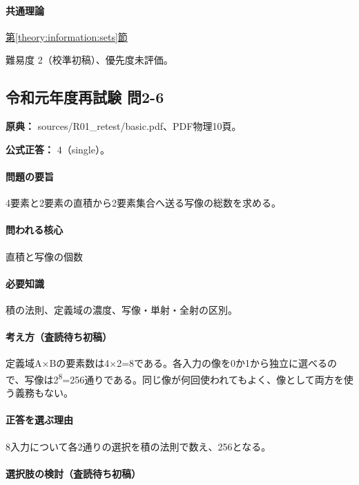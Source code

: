 \paragraph{共通理論} \hyperref[theory:information:sets]{第\ref*{theory:information:sets}節}

\par 難易度 2（校準初稿）、優先度未評価。

\subsection{令和元年度再試験 問2-6}
\label{q:r01-ret-basic-2-6}

\noindent\textbf{原典：} sources/R01\_retest/basic.pdf、PDF物理10頁。

\textbf{公式正答：} 4（single）。

\paragraph{問題の要旨} 4要素と2要素の直積から2要素集合へ送る写像の総数を求める。

\paragraph{問われる核心} 直積と写像の個数

\paragraph{必要知識} 積の法則、定義域の濃度、写像・単射・全射の区別。

\paragraph{考え方（査読待ち初稿）} 定義域A×Bの要素数は4×2=\allowbreak{}8である。各入力の像を0か1から独立に選べるので、写像は2\textsuperscript{8}=256通りである。同じ像が何回使われてもよく、像として両方を使う義務もない。

\paragraph{正答を選ぶ理由} 8入力について各2通りの選択を積の法則で数え、256となる。

\paragraph{選択肢の検討（査読待ち初稿）}\mbox{}\par

